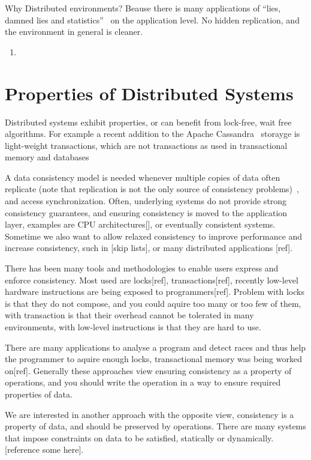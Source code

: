 \documentclass[]{usiinfprospectus}
\begin{document}
Why Distributed environments? Beause there is many applications of ``lies, damned lies and statistics''~\cite{wiki:lies:mark} on the application level. No hidden replication, and the environment in general is cleaner. 

 
\begin{enumerate}
	\item 
\end{enumerate}


\section{Properties of Distributed Systems}
Distributed systems exhibit properties, or can benefit from lock-free, wait free algorithms. For example a recent addition to the Apache Cassandra~\cite{lakshman2010cassandra} storayge is light-weight transactions, which are not transactions as used in transactional memory and databases 




A data consistency model is needed whenever multiple copies of data often replicate (note that replication is not the only source of consistency problems)~\cite{adve1996shared}, and access synchronization. Often, underlying systems do not provide strong consistency guarantees, and ensuring consistency is moved to the application layer, examples are CPU architectures[], or eventually consistent systems. Sometime we also want to allow relaxed consistency to improve performance and increase consistency, such in [skip lists], or many distributed applications [ref].

There has been many tools and methodologies to enable users express and enforce consistency. Most used are locks[ref], transactions[ref], recently low-level hardware instructions are being exposed to programmers[ref]. Problem with locks is that they do not compose, and you could aquire too many or too few of them, with transaction is that their overhead cannot be tolerated in many environments, with low-level instructions is that they are hard to use. 

There are many applications to analyse a program and detect races and thus help the programmer to aquire enough locks, transactional memory was being worked on[ref]. Generally these approaches view ensuring consistency as a property of operations, and you should write the operation in a way to ensure required properties of data.

We are interested in another approach with the opposite view, consistency is a property of data, and should be preserved by operations. There are many systems that impose constraints on data to be satisfied, statically or dynamically. [reference some here].
\end{document}
